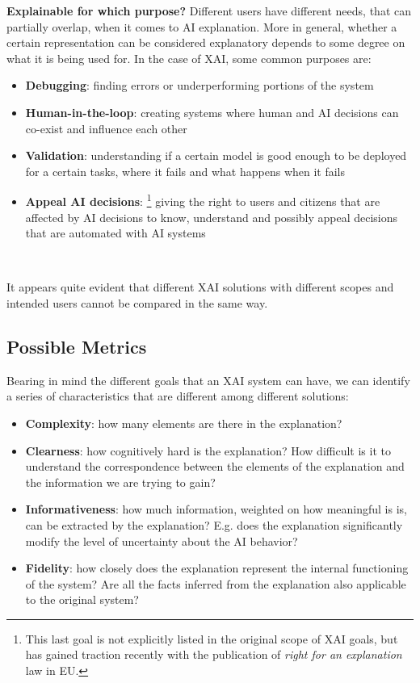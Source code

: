 \documentclass[conference]{IEEEtran}
\begin{document}
\textbf{Explainable for which purpose?} Different users have different needs,
that can partially overlap, when it comes to AI explanation. More in general,
whether a certain representation can be considered explanatory depends to some
degree on what it is being used for. In the case of XAI, some common purposes
are:

\begin{itemize}
    \item \textbf{Debugging}: finding errors or underperforming portions of the
          system
    \item \textbf{Human-in-the-loop}: creating systems where human and AI
          decisions can co-exist and influence each other
    \item \textbf{Validation}: understanding if a certain model is good enough
          to be deployed for a certain tasks, where it fails and what happens
          when it fails
    \item \textbf{Appeal AI decisions}: \footnote{This last goal is not
              explicitly listed in the original scope of XAI goals, but has
              gained traction recently with the publication of \textit{right for
                  an explanation} law in EU. } giving the right to
          users and citizens that are affected by AI decisions to know,
          understand and possibly appeal decisions that are automated with
          AI systems
\end{itemize}

\

It appears quite evident that different XAI solutions with different scopes and
intended users cannot be compared in the same way.

\subsection{Possible Metrics}
\label{sec:dimensions}

Bearing in mind the different goals that an XAI system can have, we can identify
a series of characteristics that are different among different solutions:

\begin{itemize}
    \item \textbf{Complexity}: how many elements are there in the explanation?
    \item \textbf{Clearness}: how cognitively hard is the explanation? How
          difficult is it to understand the correspondence between the elements
          of the explanation and the information we are trying to gain?
    \item \textbf{Informativeness}: how much information, weighted on how
          meaningful is is, can be extracted by the explanation? E.g. does the
          explanation significantly modify the level of uncertainty about the AI
          behavior?
    \item \textbf{Fidelity}: how closely does the explanation represent the
          internal functioning of the system? Are all the facts inferred from
          the explanation also applicable to the original system?
\end{itemize}
\end{document}
